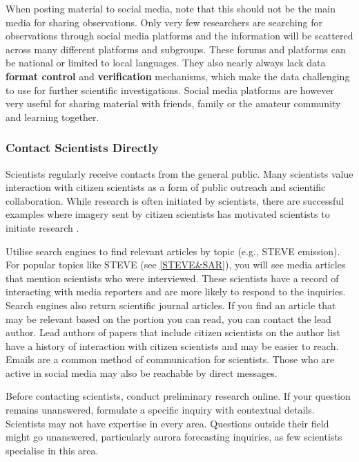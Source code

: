 \documentclass{article}
\renewcommand{\cite}[1]{\parencite{#1}}
\begin{document}
When posting material to social media, note that this should not be the main media for sharing observations. Only very few researchers are searching for observations through social media platforms and the information will be scattered across many different platforms and subgroups. These forums and platforms can be national or limited to local languages. They also nearly always lack data \textbf{format control} and \textbf{verification} mechanisms, which make the data challenging to use for further scientific investigations. Social media platforms are however very useful for sharing material with friends, family or the amateur community and learning together. 



\subsubsection{Contact Scientists Directly}

Scientists regularly receive contacts from the general public. Many scientists value interaction with citizen scientists as a form of public outreach and scientific collaboration. While research is often initiated by scientists, there are successful examples where imagery sent by citizen scientists has motivated scientists to initiate research \cite{MacDonald2018,Nishimura2022,Nishimura2023,Palmroth2020}. 

Utilise search engines to find relevant articles by topic (e.g., STEVE emission). For popular topics like STEVE (see \ref{STEVE&SAR}), you will see media articles that mention scientists who were interviewed. These scientists have a record of interacting with media reporters and are more likely to respond to the inquiries. Search engines also return scientific journal articles. If you find an article that may be relevant based on the portion you can read, you can contact the lead author. Lead authors of papers that include citizen scientists on the author list have a history of interaction with citizen scientists and may be easier to reach. Emails are a common method of communication for scientists. Those who are active in social media may also be reachable by direct messages. 

Before contacting scientists, conduct preliminary research online. If your question remains unanswered, formulate a specific inquiry with contextual details. Scientists may not have expertise in every area. Questions outside their field might go unanswered, particularly aurora forecasting inquiries, as few scientists specialise in this area. 
\end{document}
